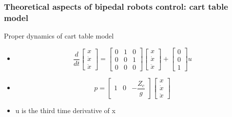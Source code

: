\documentclass{beamer}
\begin{document}

	\begin{frame}
		\frametitle{Theoretical aspects of bipedal robots control: cart table model}
		\begin{block}{Proper dynamics of cart table model}
			\begin{itemize}
				\item
					\begin{equation}
						\dfrac{d}{dt} \begin{bmatrix} x \\ \dot{x} \\ \ddot{x} \end{bmatrix} = \begin{bmatrix} 0 & 1 & 0 \\ 0 & 0 & 1 \\ 0 & 0& 0 \end{bmatrix}  \begin{bmatrix} x \\ \dot{x} \\ \ddot{x} \end{bmatrix} + \begin{bmatrix} 0 \\0 \\ 1 \end{bmatrix} u
					\end{equation}
				\item
					\begin{equation}
						p = \begin{bmatrix} 1 & 0  & - \dfrac{Z_c}{g} \end{bmatrix}\begin{bmatrix} x \\ \dot{x} \\ \ddot{x} \end{bmatrix}
					\end{equation}
				\item
					u is the third time derivative of x
			\end{itemize}
		\end{block}
	\end{frame}
	
\end{document}
